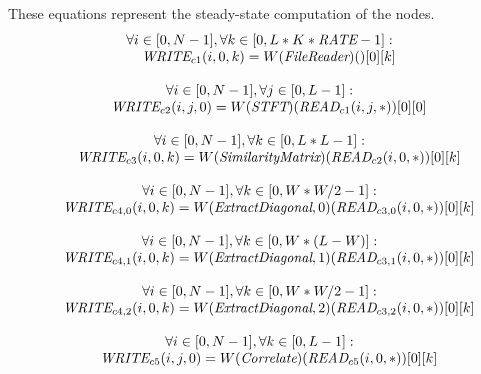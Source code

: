 These equations represent the steady-state computation of the nodes.
{\scriptsize
\begin{equation*}
\begin{array}{c}
\forall i \in [0, N-1], \forall k \in [0, L*K*\mbox{\it RATE}-1]:\\
 ~~~~\mbox{\it WRITE}_{c1}(i,0,k) = W(\mbox{\it FileReader})()[0][k] \\ ~ \\
\forall i \in [0, N-1], \forall j \in [0, L-1]:\\
 ~~~~\mbox{\it WRITE}_{c2}(i,j,0) = W(\mbox{\it STFT})(\mbox{\it READ}_{c1}(i,j,*))[0][0] \\ ~ \\
\forall i \in [0, N-1], \forall k \in [0, L*L-1]:\\
 ~~~~\mbox{\it WRITE}_{c3}(i,0,k) = W(\mbox{\it SimilarityMatrix})(\mbox{\it READ}_{c2}(i,0,*))[0][k] \\ ~ \\
\forall i \in [0, N-1], \forall k \in [0, W*W/2-1]:\\
 ~~~~\mbox{\it WRITE}_{c4,0}(i,0,k) = W(\mbox{\it ExtractDiagonal}, 0)(\mbox{\it READ}_{c3,0}(i,0,*))[0][k] \\ ~ \\
\forall i \in [0, N-1], \forall k \in [0, W*(L-W)]:\\
 ~~~~\mbox{\it WRITE}_{c4,1}(i,0,k) = W(\mbox{\it ExtractDiagonal}, 1)(\mbox{\it READ}_{c3,1}(i,0,*))[0][k] \\ ~ \\
\forall i \in [0, N-1], \forall k \in [0, W*W/2-1]:\\
 ~~~~\mbox{\it WRITE}_{c4,2}(i,0,k) = W(\mbox{\it ExtractDiagonal}, 2)(\mbox{\it READ}_{c3,2}(i,0,*))[0][k] \\ ~ \\
\forall i \in [0, N-1], \forall k \in [0, L-1]:\\
 ~~~~\mbox{\it WRITE}_{c5}(i,j,0) = W(\mbox{\it Correlate})(\mbox{\it READ}_{c5}(i,0,*))[0][k]
\end{array}
\end{equation*}}


